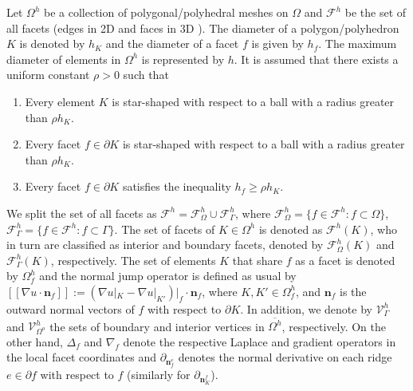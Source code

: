 \documentclass[final,reqno]{elsarticle}
\begin{document}
Let $\Omega^h$ be a collection of polygonal/polyhedral meshes on $\Omega$ and $\mathcal{F}^h$ be the set of all facets (edges in 2D and faces in 3D ). The diameter of a polygon/polyhedron $K$ is denoted by $h_K$ and the diameter of a facet $f$ is given by $h_f$. The maximum diameter of elements in $\Omega^h$ is represented by $h$. It is assumed that there exists a uniform constant $\rho>0$ such that
\begin{enumerate}[label={\textbf{(M\arabic*)}}, align=left, leftmargin=*, labelwidth=!, labelsep=1em]
    \item \label{A1} Every element $K$ is star-shaped with respect to a ball with a radius greater than $\rho h_K$. 
    \item \label{A2} Every facet $f\in \partial K$ is star-shaped with respect to a ball with a radius greater than $\rho h_K$.
    \item \label{A3} Every facet $f\in \partial K$ satisfies the inequality $h_f \geq \rho h_K$. 
\end{enumerate}

We split the set of all facets as $\mathcal{F}^h = \mathcal{F}^h_\Omega \cup \mathcal{F}^h_{\Gamma}$, where $\mathcal{F}^h_\Omega = \{ f\in \mathcal{F}^h: f\subset \Omega\}$, $\mathcal{F}^h_{\Gamma} = \{ f\in \mathcal{F}^h : f\subset \Gamma\}$. The set of facets of $K\in \Omega^h$ is denoted as $\mathcal{F}^h(K)$, who in turn are classified as interior and boundary facets, denoted by $\mathcal{F}^h_\Omega(K)$ and $\mathcal{F}^h_{\Gamma}(K)$, respectively. The set of elements $K$ that share $f$ as a facet is denoted by $\Omega^h_f$ and the normal jump operator is defined as usual by $[\![\nabla u \cdot \boldsymbol{n}_f]\!]:= (\nabla u|_{K} - \nabla u|_{K'})|_f \cdot \boldsymbol{n}_f$, where $K,K' \in \Omega^h_f$, and $\boldsymbol{n}_f$ is the outward normal vectors of $f$ with respect to $\partial K$. %
In addition, we denote by $\mathcal{V}_{\Gamma}^h$ and $\mathcal{V}_{\Omega^o}^h$ the sets of boundary and interior vertices in $\overline{\Omega^h}$, respectively. 
On the other hand, $\Delta_{f}$ and $\nabla_{f}$ denote the respective Laplace and gradient operators in the local facet coordinates and $\partial_{{\boldsymbol{n}}_f^e}$ denotes the normal derivative on each ridge $e\in \partial f$ with respect to $f$ (similarly for $\partial_{{\boldsymbol{n}}_K^f}$). 
\end{document}
